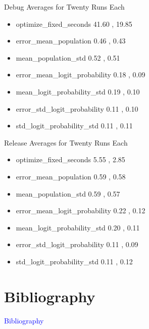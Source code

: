 \documentclass{beamer}
\newcommand{\Blue}[1]{\textcolor{blue}{#1}}
\newcommand{\Section}[1]{
	\section{#1}
	\begin{frame}
	\begin{center}
	\Blue{ \Large{#1} }
	\end{center}
	\end{frame}
}
\begin{document}
\begin{frame}{Debug Averages for Twenty Runs Each}
\begin{itemize}

\item
optimize\_fixed\_seconds
\hspace{2.0em} 41.60 , 19.85
\pause

\item
error\_mean\_population
\hspace{2.15em} 0.46 , 0.43
\pause

\item
mean\_population\_std
\hspace{2.85em} 0.52 , 0.51
\pause

\item
error\_mean\_logit\_probability
\hspace{0.0em} 0.18 , 0.09
\pause

\item
mean\_logit\_probability\_std
\hspace{0.7em} 0.19 , 0.10
\pause

\item
error\_std\_logit\_probability
\hspace{1.0em} 0.11 , 0.10
\pause

\item
std\_logit\_probability\_std
\hspace{1.6em} 0.11 , 0.11
\pause


\end{itemize}
\end{frame}
\begin{frame}{Release Averages for Twenty Runs Each}
\begin{itemize}

\item
optimize\_fixed\_seconds
\hspace{2.0em} 5.55 , 2.85
\pause

\item
error\_mean\_population
\hspace{2.15em} 0.59 , 0.58
\pause

\item
mean\_population\_std
\hspace{2.85em} 0.59 , 0.57
\pause

\item
error\_mean\_logit\_probability
\hspace{0.0em} 0.22 , 0.12
\pause

\item
mean\_logit\_probability\_std
\hspace{0.7em} 0.20 , 0.11
\pause

\item
error\_std\_logit\_probability
\hspace{1.0em} 0.11 , 0.09
\pause

\item
std\_logit\_probability\_std
\hspace{1.6em} 0.11 , 0.12
\pause


\end{itemize}
\end{frame}

\Section{Bibliography}
%
{}

\end{document}
